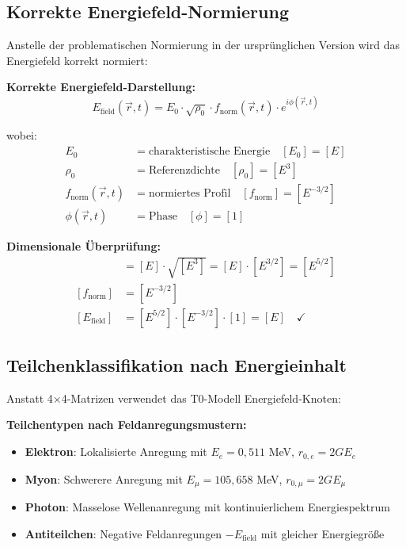 \documentclass[12pt,a4paper]{report}
\begin{document}
	\subsection{Korrekte Energiefeld-Normierung}
	\label{subsec:proper_normalization}
	
	Anstelle der problematischen Normierung in der ursprünglichen Version wird das Energiefeld korrekt normiert:
	
	\textbf{Korrekte Energiefeld-Darstellung:}
	\begin{equation}
		E_{\text{field}}(\vec{r}, t) = E_0 \cdot \sqrt{\rho_0} \cdot f_{\text{norm}}(\vec{r}, t) \cdot e^{i\phi(\vec{r}, t)}
	\end{equation}
	
	wobei:
	\begin{align}
		E_0 &= \text{charakteristische Energie} \quad [E_0] = [E] \\
		\rho_0 &= \text{Referenzdichte} \quad [\rho_0] = [E^3] \\
		f_{\text{norm}}(\vec{r}, t) &= \text{normiertes Profil} \quad [f_{\text{norm}}] = [E^{-3/2}] \\
		\phi(\vec{r}, t) &= \text{Phase} \quad [\phi] = [1]
	\end{align}
	
	\textbf{Dimensionale Überprüfung:}
	\begin{align}
		[E_0 \cdot \sqrt{\rho_0}] &= [E] \cdot \sqrt{[E^3]} = [E] \cdot [E^{3/2}] = [E^{5/2}] \\
		[f_{\text{norm}}] &= [E^{-3/2}] \\
		[E_{\text{field}}] &= [E^{5/2}] \cdot [E^{-3/2}] \cdot [1] = [E] \quad \checkmark
	\end{align}
	
	\subsection{Teilchenklassifikation nach Energieinhalt}
	\label{subsec:particle_classification}
	
	Anstatt 4×4-Matrizen verwendet das T0-Modell Energiefeld-Knoten:
	
	\textbf{Teilchentypen nach Feldanregungsmustern:}
	\begin{itemize}
		\item \textbf{Elektron}: Lokalisierte Anregung mit $E_e = 0,511$ MeV, $r_{0,e} = 2GE_e$
		\item \textbf{Myon}: Schwerere Anregung mit $E_\mu = 105,658$ MeV, $r_{0,\mu} = 2GE_\mu$  
		\item \textbf{Photon}: Masselose Wellenanregung mit kontinuierlichem Energiespektrum
		\item \textbf{Antiteilchen}: Negative Feldanregungen $-E_{\text{field}}$ mit gleicher Energiegröße
	\end{itemize}
	
\end{document}
